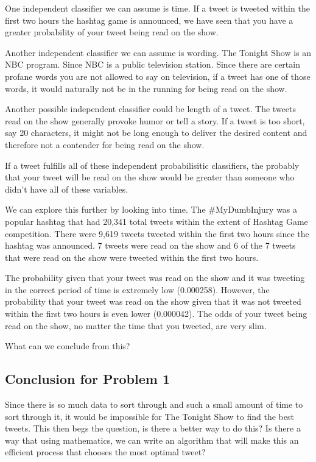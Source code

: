 \documentclass[titlepage]{article}
\begin{document}
One independent classifier we can assume is time. If a tweet is tweeted within the first two hours the hashtag game is announced, we have seen that you have a greater probability of your tweet being read on the show. 

Another independent classifier we can assume is wording. The Tonight Show is an NBC program. Since NBC is a public television station. Since there are certain profane words you are not allowed to say on television, if a tweet has one of those words, it would naturally not be in the running for being read on the show. 

Another possible independent classifier could be length of a tweet. The tweets read on the show generally provoke humor or tell a story. If a tweet is too short, say 20 characters, it might not be long enough to deliver the desired content and therefore not a contender for being read on the show.

If a tweet fulfills all of these independent probabilisitic classifiers, the probably that your tweet will be read on the show would be greater than someone who didn't have all of these variables.

We can explore this further by looking into time. The \#MyDumbInjury was a popular hashtag that had 20,341 total tweets within the extent of Hashtag Game competition. There were 9,619 tweets tweeted within the first two hours since the hashtag was announced. 7 tweets were read on the show and 6 of the 7 tweets that were read on the show were tweeted within the first two hours. 

The probability given that your tweet was read on the show and it was tweeting in the correct period of time is extremely low (0.000258). However, the probability that your tweet was read on the show given that it was not tweeted within the first two hours is even lower (0.000042). The odds of your tweet being read on the show, no matter the time that you tweeted, are very slim.

What can we conclude from this?


\subsection{Conclusion for Problem 1}

Since there is so much data to sort through and such a small amount of time to sort through it, it would be impossible for The Tonight Show to find the best tweets. This then begs the question, is there a better way to do this? Is there a way that using mathematics, we can write an algorithm that will make this an efficient process that chooses the most optimal tweet? 
\end{document}
